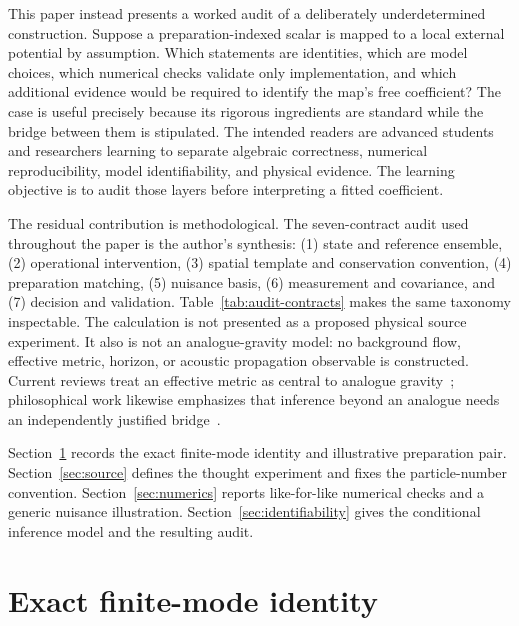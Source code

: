 \documentclass[aps,prd,twocolumn,superscriptaddress,nofootinbib,floatfix]{revtex4-2}
\begin{document}
This paper instead presents a worked audit of a deliberately underdetermined construction. Suppose a preparation-indexed scalar is mapped to a local external potential by assumption. Which statements are identities, which are model choices, which numerical checks validate only implementation, and which additional evidence would be required to identify the map's free coefficient? The case is useful precisely because its rigorous ingredients are standard while the bridge between them is stipulated. The intended readers are advanced students and researchers learning to separate algebraic correctness, numerical reproducibility, model identifiability, and physical evidence. The learning objective is to audit those layers before interpreting a fitted coefficient.

The residual contribution is methodological. The seven-contract audit used throughout the paper is the author's synthesis: (1) state and reference ensemble, (2) operational intervention, (3) spatial template and conservation convention, (4) preparation matching, (5) nuisance basis, (6) measurement and covariance, and (7) decision and validation. Table~\ref{tab:audit-contracts} makes the same taxonomy inspectable. The calculation is not presented as a proposed physical source experiment. It also is not an analogue-gravity model: no background flow, effective metric, horizon, or acoustic propagation observable is constructed. Current reviews treat an effective metric as central to analogue gravity~\cite{Barcelo2026}; philosophical work likewise emphasizes that inference beyond an analogue needs an independently justified bridge~\cite{Dardashti2017}.

Section~\ref{sec:identity} records the exact finite-mode identity and illustrative preparation pair. Section~\ref{sec:source} defines the thought experiment and fixes the particle-number convention. Section~\ref{sec:numerics} reports like-for-like numerical checks and a generic nuisance illustration. Section~\ref{sec:identifiability} gives the conditional inference model and the resulting audit.

\section{Exact finite-mode identity}
\label{sec:identity}
\end{document}
